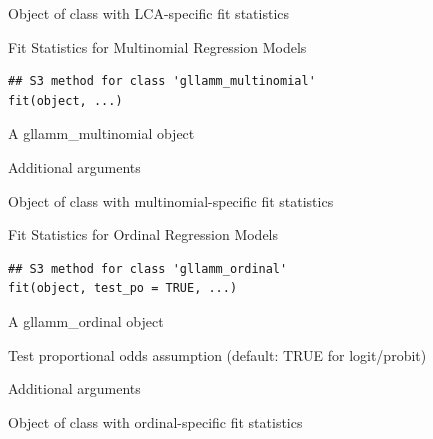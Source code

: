 \documentclass[a4paper]{book}
\begin{document}
%
\begin{Value}
Object of class  with LCA-specific fit statistics
\end{Value}
%
\begin{Description}
Fit Statistics for Multinomial Regression Models
\end{Description}
%
\begin{Usage}
\begin{verbatim}
## S3 method for class 'gllamm_multinomial'
fit(object, ...)
\end{verbatim}
\end{Usage}
%
\begin{Arguments}
\begin{ldescription}
\item[\code{object}] A gllamm\_multinomial object

\item[\code{...}] Additional arguments
\end{ldescription}
\end{Arguments}
%
\begin{Value}
Object of class  with multinomial-specific fit statistics
\end{Value}
%
\begin{Description}
Fit Statistics for Ordinal Regression Models
\end{Description}
%
\begin{Usage}
\begin{verbatim}
## S3 method for class 'gllamm_ordinal'
fit(object, test_po = TRUE, ...)
\end{verbatim}
\end{Usage}
%
\begin{Arguments}
\begin{ldescription}
\item[\code{object}] A gllamm\_ordinal object

\item[\code{test\_po}] Test proportional odds assumption (default: TRUE for logit/probit)

\item[\code{...}] Additional arguments
\end{ldescription}
\end{Arguments}
%
\begin{Value}
Object of class  with ordinal-specific fit statistics
\end{Value}
\end{document}
